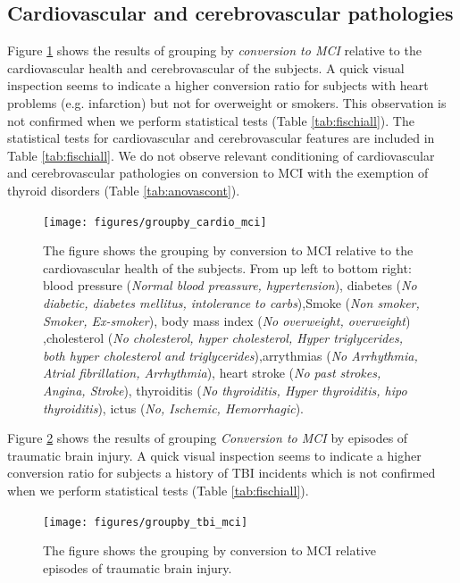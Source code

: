 \documentclass[11pt]{article}
\theoremstyle{definition}
\theoremstyle{remark}
\begin{document}
\subsection{Cardiovascular and cerebrovascular pathologies}
Figure \ref{fig:groupby_cardio_mci} shows the results of grouping by \emph{conversion to MCI} relative to the cardiovascular health and cerebrovascular of the subjects. A quick visual inspection seems to indicate a higher conversion ratio for subjects with heart problems (e.g. infarction) but not for overweight or smokers.
This observation is not confirmed when we perform statistical tests (Table \ref{tab:fischiall}).
The statistical tests for cardiovascular and cerebrovascular features are included in Table \ref{tab:fischiall}. We do not observe relevant conditioning of cardiovascular and cerebrovascular pathologies on conversion to MCI with the exemption of thyroid disorders (Table \ref{tab:anovascont}).
\begin{figure}[!htb]
        \centering
        \texttt{[image: figures/groupby\_cardio\_mci]}
        \caption{The figure shows the grouping by conversion to MCI relative to the cardiovascular health of the subjects. From up left to bottom right: blood pressure (\emph{Normal blood preassure, hypertension}), diabetes (\emph{No diabetic, diabetes mellitus, intolerance to carbs}),Smoke (\emph{Non smoker, Smoker, Ex-smoker}), body mass index (\emph{No overweight, overweight}) ,cholesterol (\emph{No cholesterol, hyper cholesterol, Hyper triglycerides, both hyper cholesterol and triglycerides}),arrythmias (\emph{No Arrhythmia, Atrial fibrillation, Arrhythmia}), heart stroke (\emph{No past strokes, Angina, Stroke}), thyroiditis (\emph{No thyroiditis, Hyper thyroiditis, hipo thyroiditis}), ictus (\emph{No, Ischemic, Hemorrhagic}).}
        \label{fig:groupby_cardio_mci}
\end{figure}

Figure \ref{fig:groupby_tbi_mci} shows the results of grouping \emph{Conversion to MCI} by episodes of traumatic brain injury. A quick visual inspection seems to indicate a higher conversion ratio for subjects a history of TBI incidents which is not confirmed when we perform statistical tests (Table \ref{tab:fischiall}).

\begin{figure}[!htb]
        \centering
        \texttt{[image: figures/groupby\_tbi\_mci]}
        \caption{The figure shows the grouping by conversion to MCI relative episodes of traumatic brain injury.}
        \label{fig:groupby_tbi_mci}
\end{figure}
\end{document}
